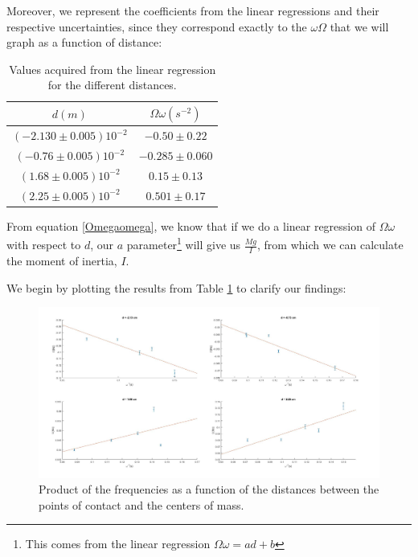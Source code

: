 \documentclass[a4paper,12pt]{article}
\begin{document}
Moreover, we represent the coefficients from the linear regressions and their respective uncertainties, since they correspond exactly to the $\omega \Omega$ that we will graph as a function of distance:

\begin{table}[H]
	\centering
  \caption{Values acquired from the linear regression for the different distances.}
  \begin{tabular}{|c|c|}
    \hline
    $d(m)$ & $\Omega \omega (s^{-2})$\\
        \hline
    $(-2.130 \pm 0.005) 10^{-2}$  & $-0.50 \pm 0.22$ \\
    \hline
    $(-0.76 \pm 0.005) 10^{-2}$ & $-0.285 \pm 0.060$ \\
    \hline
    $(1.68 \pm 0.005)10^{-2 }$ & $0.15 \pm 0.13$\\
    \hline
    $(2.25 \pm 0.005)10^{-2}$ & $0.501 \pm 0.17$\\
    \hline
  \end{tabular}
  \label{tabl:Omom}
\end{table}

From equation \eqref{Omegaomega}, we know that if we do a linear regression of $\Omega \omega$ with respect to $d$, our $a$ parameter\footnote{This comes from the linear regression  $\Omega \omega = a d + b$} will give us $\frac{Mg}{I}$, from which we can calculate the moment of inertia, $I$. 

We begin by plotting the results from Table \ref{tabl:Omom} to clarify our findings:

\begin{figure}[h!]
	\label{foda2}
	\caption{Product of the frequencies as a function of the distances between the points of contact and the centers of mass.}
	\includegraphics[width=\textwidth]{correct.jpg}
\end{figure} 
\end{document}
